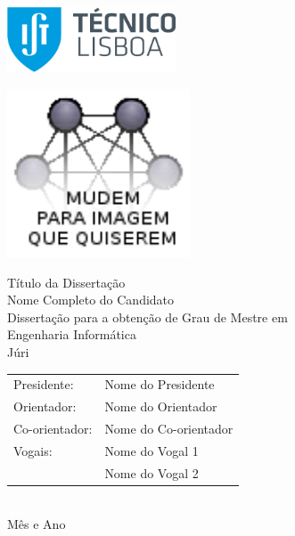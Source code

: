 \thispagestyle {empty}

\includegraphics[width=5.0cm]{Logo.png}

\begin{center}
%
\vspace{0.3cm}
\includegraphics[height=50mm]{Figures/frontImage.png}

\vspace{0.8cm}
{\FontLb Título da Dissertação} \\
\vspace{2.6cm}
{\FontMb Nome Completo do Candidato} \\
\vspace{1.9cm}
{\FontLn Disserta\c{c}\~{a}o para a obten\c{c}\~{a}o de Grau de Mestre em} \\
\vspace{0.3cm}
{\FontLb Engenharia Informática} \\
\vspace{1.9cm}
{\FontMb J\'{u}ri} \\
\vspace{0.3cm}
{\FontSn %
\begin{tabular}{ll}
Presidente: & Nome do Presidente \\
Orientador: & Nome do Orientador \\
Co-orientador: & Nome do Co-orientador \\
Vogais: & Nome do Vogal 1 \\
        & Nome do Vogal 2 \\
\end{tabular} } \\
\vspace{1.5cm}
{\FontMb M\^{e}s e Ano} \\
%
\end{center}

\cleardoublepage
